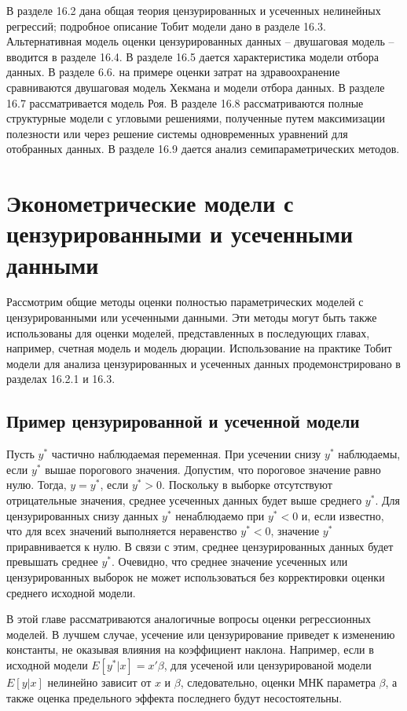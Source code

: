 В разделе 16.2 дана общая теория цензурированных и усеченных нелинейных регрессий; подробное описание Тобит модели дано в разделе 16.3. Альтернативная модель оценки цензурированных данных -- двушаговая модель -- вводится в разделе 16.4. В разделе 16.5 дается характеристика модели отбора данных. В разделе 6.6. на примере оценки затрат на здравоохранение сравниваются двушаговая модель Хекмана и модели отбора данных. В разделе 16.7 рассматривается модель Роя. В разделе 16.8 рассматриваются полные структурные модели с угловыми решениями, полученные путем максимизации полезности или через решение системы одновременных уравнений для отобранных данных. В разделе 16.9 дается анализ семипараметрических методов.


\section{Эконометрические модели с цензурированными и усеченными данными}

Рассмотрим общие методы оценки полностью параметрических моделей с цензурированными или усеченными данными. Эти методы могут быть также использованы для оценки моделей, представленных в последующих главах, например, счетная модель и модель дюрации. Использование на практике Тобит модели для анализа цензурированных и усеченных данных продемонстрировано в разделах 16.2.1 и 16.3.

\subsection{Пример цензурированной и усеченной модели}

Пусть $y^{*}$ частично наблюдаемая переменная. При усечении снизу $y^{*}$ наблюдаемы, если $y^{*}$ вышае порогового значения. Допустим, что пороговое значение равно нулю. Тогда, $y=y^{*}$, если $y^{*}>0$. Поскольку в выборке отсутствуют отрицательные значения, среднее усеченных данных будет выше среднего $y^{*}$. Для цензурированных снизу данных $y^{*}$ ненаблюдаемо при $y^{*}<0$ и, если известно, что для всех значений выполняется неравенство $y^{*}<0$, значение $y^{*}$ приравнивается к нулю. В связи с этим, среднее цензурированных данных будет превышать среднее $y^{*}$. Очевидно, что среднее значение усеченных или цензурированных выборок не может использоваться без корректировки оценки среднего исходной модели.

В этой главе рассматриваются аналогичные вопросы оценки регрессионных моделей. В лучшем случае, усечение или цензурирование приведет к изменению константы, не оказывая влияния на коэффициент наклона. Например, если в исходной модели $E[y^{*}|x]=x'\beta$, для усеченой или цензурированой модели $E[y|x]$ нелинейно зависит от $x$ и $\beta$, следовательно, оценки МНК параметра $\beta$, а также оценка предельного эффекта последнего будут несостоятельны.

